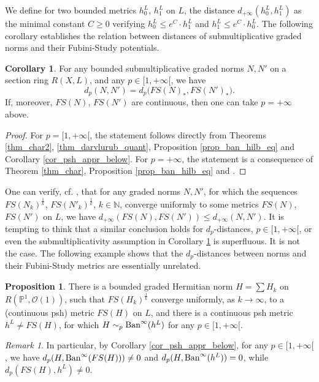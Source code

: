 \documentclass[12pt]{article}
\numberwithin{equation}{section}
\theoremstyle{theorem}
\theoremstyle{definition}
\newtheorem{prop}[thm]{Proposition}
\newtheorem{cor}[thm]{Corollary}
\theoremstyle{remark}
\newtheorem{rem}[thm]{Remark}
\newcommand{\nat}{\mathbb{N}}
\begin{document}
	\par 
	We define for two bounded metrics $h^L_0$, $h^L_1$ on $L$, the distance $d_{+\infty} ( h^L_0, h^L_1)$ as the minimal constant $C \geq 0$ verifying $h^L_0 \leq e^C \cdot h^L_1$ and $h^L_1 \leq e^C \cdot h^L_0$.
	The following corollary establishes the relation between distances of submultiplicative graded norms and their Fubini-Study potentials.
	\begin{cor}\label{cor_d_p_norm_fs_rel}
		For any bounded submultiplicative graded norms $N, N'$ on a section ring $R(X, L)$, and any $p \in [1, +\infty[$, we have
		\begin{equation}
			d_p(N, N') 
			=
			d_p \big( FS(N)_*, FS(N')_* \big). 
		\end{equation}
		If, moreover, $FS(N)$, $FS(N')$ are continuous, then one can take $p = +\infty$ above.
	\end{cor}	
	\begin{proof}
		For $p = [1, +\infty[$, the statement follows directly from Theorems \ref{thm_char2}, \ref{thm_darvlurub_quant}, Proposition \ref{prop_ban_hilb_eq} and Corollary \ref{cor_psh_appr_below}.
		For $p = +\infty$, the statement is a consequence of Theorem \ref{thm_char}, Proposition \ref{prop_ban_hilb_eq} and \cite[Theorem 1.7]{FinSecRing}.
	\end{proof}
	\par 
	One can verify, cf. \cite[Lemma 4.12]{FinSecRing}, that for any graded norms $N, N'$, for which the sequences $FS(N_k)^{\frac{1}{k}}$, $FS(N'_k)^{\frac{1}{k}}$, $k \in \nat$, converge uniformly to some metrics $FS(N)$, $FS(N')$ on $L$, we have $d_{+\infty} ( FS(N), FS(N')) \leq  d_{+ \infty}(N, N')$.
	It is tempting to think that a similar conclusion holds for $d_p$-distances, $p \in [1, +\infty[$, or even the submultiplicativity assumption in Corollary \ref{cor_d_p_norm_fs_rel} is superfluous.
	It is not the case.
	The following example shows that the $d_p$-distances between norms and their Fubini-Study metrics are essentially unrelated. 
	\begin{prop}\label{prop_ex_dp_nnwork}
		There is a bounded graded Hermitian norm $H = \sum H_k$ on $R(\mathbb{P}^1, \mathscr{O}(1))$, such that $FS(H_k)^{\frac{1}{k}}$ converge uniformly, as $k \to \infty$, to a (continuous psh) metric $FS(H)$ on $L$, and there is a continuous psh metric $h^L \neq FS(H)$, for which $H \sim_p {\rm{Ban}}^{\infty}(h^L)$ for any $p \in [1, +\infty[$.
	\end{prop}
	\begin{sloppypar}
	\begin{rem}
		In particular, by Corollary \ref{cor_psh_appr_below}, for any $p \in [1, +\infty[$, we have $d_p(H, {\rm{Ban}}^{\infty}(FS(H))) \neq 0$ and $d_p(H, {\rm{Ban}}^{\infty}(h^L)) = 0$, while $d_p(FS(H), h^L) \neq 0$.
	\end{rem}
	\end{sloppypar}
\end{document}
